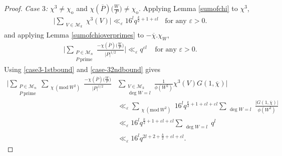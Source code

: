 \documentclass[12pt,reqno]{amsart}
\newcommand{\Mod}[1]{\ (\mathrm{mod}\ #1)}
\newcommand{\CM}{\mathcal{M}}
\begin{document}
\begin{proof}
\textit{Case $3$:} $\chi^{3} \neq \chi_{\mathrm{o}}$ and $\chi(\overline{P}) \Big (\frac{W}{P} \Big ) \neq \chi_{\mathrm{o}}$. Applying Lemma \ref{sumofchi} to $\chi^3$, 
\begin{align}\label{case3-1stbound}
\Big | \sum_{\substack{V \in \mathcal{M}_k}} \chi^3(V) \Big | \ll_{\varepsilon} 16^l q^{\frac{k}{2} + 1 +\varepsilon l } \ \ \ \ \text{for any $\varepsilon > 0 $}.
\end{align}
and applying Lemma \ref{sumofchioverprimes} to $-\overline{\chi}.\chi_{W}$,
\begin{align}\label{case-32ndbound}
    \Big | \sum_{\substack{P \in \CM_{n} \\ P \ \text{prime} }} \frac{-\chi(\overline{P}) \Big (\frac{W}{P} \Big )}{|P|^{1/2}} \Big | \ll_{\varepsilon} q^{\varepsilon l} \ \ \ \ \ \text{for any $\varepsilon > 0$}.
\end{align}
Using \eqref{case3-1stbound} and \eqref{case-32ndbound} gives 
\begin{align*}
\Big | \sum_{\substack{P \in \CM_{n} \\ P \ \text{prime} }}  \sum_{\substack{\chi \Mod{ W^2}}} \frac{-\chi(\overline{P}) \Big (\frac{W}{P} \Big )}{|P|^{1/2}}  &\sum_{\substack{V \in \mathcal{M}_k \\ \deg W =l}} \frac{1}{\phi(W^2)} \chi^3(V) G(1,\overline{\chi}) \Big | \\ & \ll_{\varepsilon}  \sum_{\substack{\chi \Mod{ W^2}}} 16^{l} q^{\frac{k}{2}+ 1+\varepsilon l +\varepsilon l } \sum_{\substack{\deg W =l}}\frac{|G(1,\overline{\chi})|}{\phi(W^2)}
\\
& \ll_{\varepsilon} 16^{l} q^{\frac{k}{2}+ 1+ \varepsilon l + \varepsilon l } \sum_{\substack{\deg W =l}} q^l
\\
& \ll_{\varepsilon} 16^{l} q^{2l+2+ \frac{k}{2}+ \varepsilon l +\varepsilon l}.
\end{align*}

\end{proof}
\end{document}
